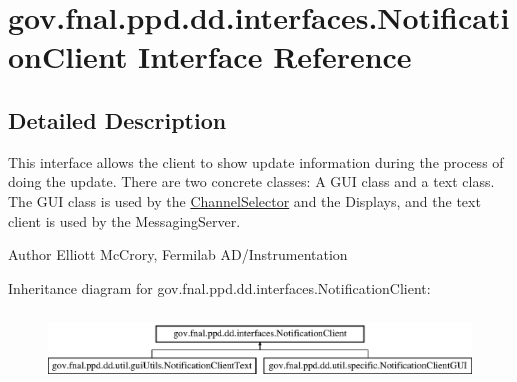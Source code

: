 \hypertarget{interfacegov_1_1fnal_1_1ppd_1_1dd_1_1interfaces_1_1NotificationClient}{\section{gov.\-fnal.\-ppd.\-dd.\-interfaces.\-Notification\-Client Interface Reference}
\label{interfacegov_1_1fnal_1_1ppd_1_1dd_1_1interfaces_1_1NotificationClient}
}


\subsection{Detailed Description}
This interface allows the client to show update information during the process of doing the update. There are two concrete classes\-: A G\-U\-I class and a text class. The G\-U\-I class is used by the \hyperlink{classgov_1_1fnal_1_1ppd_1_1dd_1_1ChannelSelector}{Channel\-Selector} and the Displays, and the text client is used by the Messaging\-Server.

\begin{DoxyAuthor}{Author}
Elliott Mc\-Crory, Fermilab A\-D/\-Instrumentation 
\end{DoxyAuthor}
Inheritance diagram for gov.\-fnal.\-ppd.\-dd.\-interfaces.\-Notification\-Client\-:\begin{figure}[H]
\begin{center}
\leavevmode
\includegraphics[height=1.891892cm]{interfacegov_1_1fnal_1_1ppd_1_1dd_1_1interfaces_1_1NotificationClient}
\end{center}
\end{figure}
